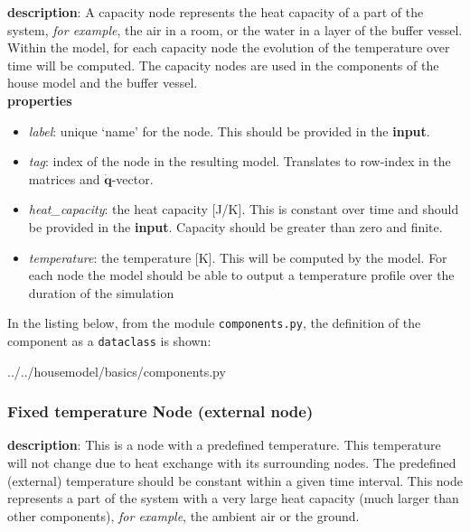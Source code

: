 \textbf{description}: A capacity node represents the heat capacity of a part of the system, \textit{for example}, the air in a room, or the water in a layer of the buffer vessel. Within the model, for each capacity node the evolution of the temperature over time will be computed. The capacity nodes are used in the components of the house model and the buffer vessel. 
\\
\textbf{properties}

\begin{itemize}
	\item \emph{label}: unique `name' for the node. This should be provided in the \textbf{input}.
	\item \emph{tag}: index of the node in the resulting model. Translates to row-index in the matrices and $\mathbf{\dot{q}}$-vector.
	\item \emph{heat\_capacity}: the heat capacity [J/K]. This is constant over time and should be provided in the \textbf{input}. Capacity should be greater than zero and finite.  
	\item \emph{temperature}: the temperature [K]. This will be computed by the model. For each node the model should be able to output a temperature profile over the duration of the simulation
\end{itemize}

In the listing below, from the module \texttt{components.py}, the definition of the component as a \texttt{dataclass} is shown: 
\begin{minipage}{\linewidth}
	
	{../../housemodel/basics/components.py}
\end{minipage}

\subsubsection{Fixed temperature Node (external node)} \label{sec:fixnode}
\textbf{description}: This is a node with a predefined temperature. This temperature will not change due to heat exchange with its surrounding nodes. The predefined (external) temperature should be constant within a given time interval. This node represents a part of the system with a very large heat capacity (much larger than other components), \textit{for example}, the ambient air or the ground. 

